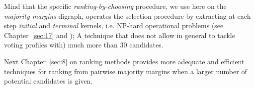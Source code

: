 Mind that the specific \emph{ranking-by-choosing} procedure, we use here on the \emph{majority margins} digraph, operates the selection procedure by extracting at each step \emph{initial} and \emph{terminal} kernels, i.e. NP-hard operational problems (see Chapter~\vref{sec:17} and \citet{BIS-1999}); A technique that does not allow in general to tackle voting profiles with) much more than 30 candidates.

\vspace{1cm}

Next Chapter~\vref{sec:8} on ranking methods provides more adequate and efficient techniques for ranking from pairwise majority margins when a larger number of potential candidates is given.  

\clearpage


%
